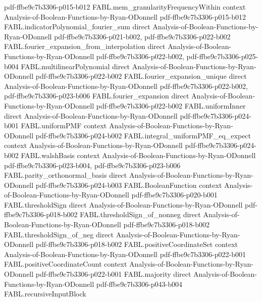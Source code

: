 \begin{theorem}
  {pdf-ffbe9c7b3306-p015-b012}
\proofstep
  {FABL.mem_granularityFrequencyWithin}
  {context}
  {Analysis-of-Boolean-Functions-by-Ryan-ODonnell}
  {pdf-ffbe9c7b3306-p015-b012}
\proofstep
  {FABL.indicatorPolynomial_fourier_sum}
  {direct}
  {Analysis-of-Boolean-Functions-by-Ryan-ODonnell}
  {pdf-ffbe9c7b3306-p021-b002,
    pdf-ffbe9c7b3306-p022-b002}
\proofstep
  {FABL.fourier_expansion_from_interpolation}
  {direct}
  {Analysis-of-Boolean-Functions-by-Ryan-ODonnell}
  {pdf-ffbe9c7b3306-p022-b002,
    pdf-ffbe9c7b3306-p025-b004}
\proofstep
  {FABL.multilinearPolynomial}
  {direct}
  {Analysis-of-Boolean-Functions-by-Ryan-ODonnell}
  {pdf-ffbe9c7b3306-p022-b002}
\proofstep
  {FABL.fourier_expansion_unique}
  {direct}
  {Analysis-of-Boolean-Functions-by-Ryan-ODonnell}
  {pdf-ffbe9c7b3306-p022-b002,
    pdf-ffbe9c7b3306-p023-b006}
\proofstep
  {FABL.fourier_expansion}
  {direct}
  {Analysis-of-Boolean-Functions-by-Ryan-ODonnell}
  {pdf-ffbe9c7b3306-p022-b002}
\proofstep
  {FABL.uniformInner}
  {direct}
  {Analysis-of-Boolean-Functions-by-Ryan-ODonnell}
  {pdf-ffbe9c7b3306-p024-b001}
\proofstep
  {FABL.uniformPMF}
  {context}
  {Analysis-of-Boolean-Functions-by-Ryan-ODonnell}
  {pdf-ffbe9c7b3306-p024-b002}
\proofstep
  {FABL.integral_uniformPMF_eq_expect}
  {context}
  {Analysis-of-Boolean-Functions-by-Ryan-ODonnell}
  {pdf-ffbe9c7b3306-p024-b002}
\proofstep
  {FABL.walshBasis}
  {context}
  {Analysis-of-Boolean-Functions-by-Ryan-ODonnell}
  {pdf-ffbe9c7b3306-p023-b004,
    pdf-ffbe9c7b3306-p023-b006}
\proofstep
  {FABL.parity_orthonormal_basis}
  {direct}
  {Analysis-of-Boolean-Functions-by-Ryan-ODonnell}
  {pdf-ffbe9c7b3306-p024-b003}
\proofstep
  {FABL.BooleanFunction}
  {context}
  {Analysis-of-Boolean-Functions-by-Ryan-ODonnell}
  {pdf-ffbe9c7b3306-p020-b001}
\proofstep
  {FABL.thresholdSign}
  {direct}
  {Analysis-of-Boolean-Functions-by-Ryan-ODonnell}
  {pdf-ffbe9c7b3306-p018-b002}
\proofstep
  {FABL.thresholdSign_of_nonneg}
  {direct}
  {Analysis-of-Boolean-Functions-by-Ryan-ODonnell}
  {pdf-ffbe9c7b3306-p018-b002}
\proofstep
  {FABL.thresholdSign_of_neg}
  {direct}
  {Analysis-of-Boolean-Functions-by-Ryan-ODonnell}
  {pdf-ffbe9c7b3306-p018-b002}
\proofstep
  {FABL.positiveCoordinateSet}
  {context}
  {Analysis-of-Boolean-Functions-by-Ryan-ODonnell}
  {pdf-ffbe9c7b3306-p022-b001}
\proofstep
  {FABL.positiveCoordinateCount}
  {context}
  {Analysis-of-Boolean-Functions-by-Ryan-ODonnell}
  {pdf-ffbe9c7b3306-p022-b001}
\proofstep
  {FABL.majority}
  {direct}
  {Analysis-of-Boolean-Functions-by-Ryan-ODonnell}
  {pdf-ffbe9c7b3306-p043-b004}
\proofstep
  {FABL.recursiveInputBlock}

\end{theorem}
